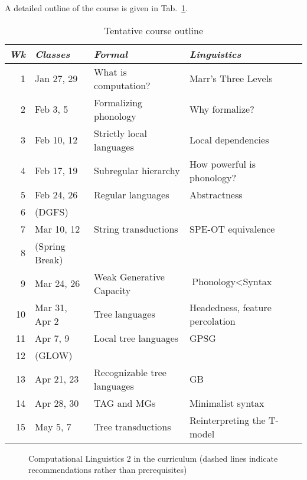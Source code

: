 A detailed outline of the course is given in Tab.~\ref{tab:Syllabus_CourseOutline}.

\begin{table}
    \centering
    \begin{tabular}{rlp{4.5cm}p{4.5cm}}
        \toprule
        \emph{Wk} & \emph{Classes} & \emph{Formal} & \emph{Linguistics} \\
        \toprule
        1         & Jan 27, 29     & What is computation? & Marr's Three Levels\\
        2         & Feb 3, 5       & Formalizing phonology & Why formalize?\\
        3         & Feb 10, 12     & Strictly local languages & Local dependencies\\
        4         & Feb 17, 19     & Subregular hierarchy & How powerful is phonology?\\
        5         & Feb 24, 26     & Regular languages & Abstractness\\
        6         & (DGFS)         & & \\
        7         & Mar 10, 12     & String transductions & SPE-OT equivalence\\
        \midrule
        8         & (Spring Break) & & \\
        \midrule
        9         & Mar 24, 26     & Weak Generative Capacity & $\text{Phonology} < \text{Syntax}$\\
        10        & Mar 31, Apr 2  & Tree languages & Headedness, feature percolation\\
        11        & Apr 7, 9       & Local tree languages & GPSG\\
        12        & (GLOW)         & & \\
        13        & Apr 21, 23     & Recognizable tree languages & GB\\
        14        & Apr 28, 30     & TAG and MGs & Minimalist syntax\\
        15        & May 5, 7       & Tree transductions & Reinterpreting the T-model\\
        \bottomrule
    \end{tabular}
\caption{Tentative course outline}
\label{tab:Syllabus_CourseOutline}
\end{table}

\begin{figure}
\caption{Computational Linguistics 2 in the curriculum (dashed lines indicate recommendations rather than prerequisites)}
\label{fig:Syllabus_Program}
\end{figure}    

